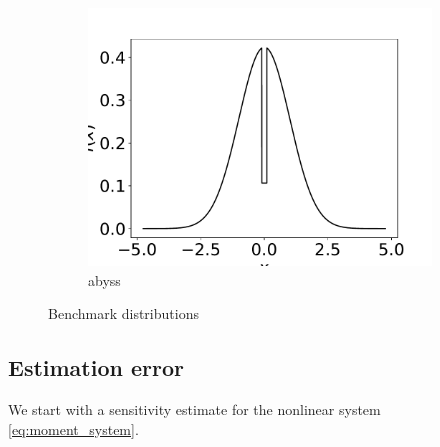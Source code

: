 \documentclass{article}
\begin{document}
\begin{figure}[htb]
\begin{subfigure}{0.333\textwidth}
  \includegraphics[width=\linewidth]{benchmark_distributions/abyss.pdf}
  \caption{abyss}
  \label{fig:abyss}
\end{subfigure}
\caption{Benchmark distributions}
\label{fig:images}
\end{figure}
\FloatBarrier


\subsection{Estimation error}
We start with a sensitivity estimate for the nonlinear system \eqref{eq:moment_system}.
\end{document}
